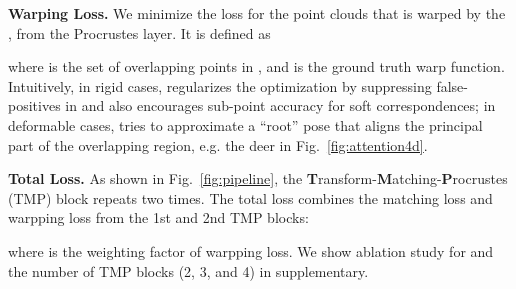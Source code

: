 \medskip
\noindent
\textbf{Warping Loss.}
We minimize the  loss for the point clouds that is warped by the , from the Procrustes layer. It is defined as

where  is the set of overlapping points in , and  is the ground truth warp function.
Intuitively, in rigid cases,  regularizes the optimization by suppressing false-positives in  and also encourages sub-point accuracy for soft correspondences; 
in deformable cases,  tries to approximate a ``root'' pose that aligns the principal part of the overlapping region, e.g. the deer in Fig.~\ref{fig:attention4d}.


 

 
\medskip
\noindent
\textbf{Total Loss.}
As shown in Fig.~\ref{fig:pipeline}, the \textbf{T}ransform-\textbf{M}atching-\textbf{P}rocrustes (TMP) block repeats two times. The total loss combines the matching loss and warpping loss from the 1st and 2nd TMP blocks:

where  is the weighting factor of warpping loss.  We show ablation study for  and the number of TMP blocks (2, 3, and 4) in supplementary.
